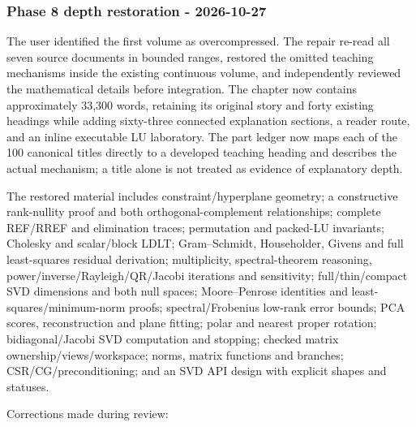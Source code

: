 \subsubsection{Phase 8 depth restoration - 2026-10-27}\label{appendix-a103e7846d21-phase-8-depth-restoration---2026-10-27}

\hypertarget{appendix-a103e7846d21-phase-8-depth-restoration---2026-10-27}{}

The user identified the first volume as overcompressed. The repair re-read all seven source documents in bounded ranges, restored the omitted teaching mechanisms inside the existing continuous volume, and independently reviewed the mathematical details before integration. The chapter now contains approximately 33,300 words, retaining its original story and forty existing headings while adding sixty-three connected explanation sections, a reader route, and an inline executable LU laboratory. The part ledger now maps each of the 100 canonical titles directly to a developed teaching heading and describes the actual mechanism; a title alone is not treated as evidence of explanatory depth.

The restored material includes constraint/hyperplane geometry; a constructive rank-nullity proof and both orthogonal-complement relationships; complete REF/RREF and elimination traces; permutation and packed-LU invariants; Cholesky and scalar/block LDLT; Gram--Schmidt, Householder, Givens and full least-squares residual derivation; multiplicity, spectral-theorem reasoning, power/inverse/Rayleigh/QR/Jacobi iterations and sensitivity; full/thin/compact SVD dimensions and both null spaces; Moore--Penrose identities and least-squares/minimum-norm proofs; spectral/Frobenius low-rank error bounds; PCA scores, reconstruction and plane fitting; polar and nearest proper rotation; bidiagonal/Jacobi SVD computation and stopping; checked matrix ownership/views/workspace; norms, matrix functions and branches; CSR/CG/preconditioning; and an SVD API design with explicit shapes and statuses.

Corrections made during review:

